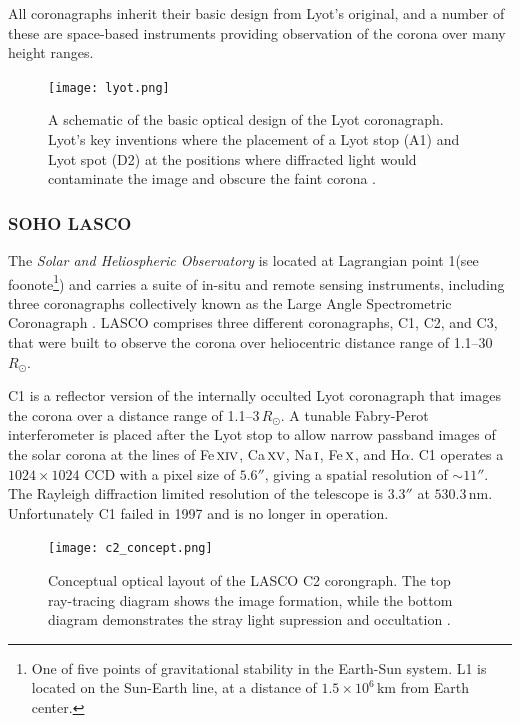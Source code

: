 All coronagraphs inherit their basic design from Lyot's original, and a number of these are space-based instruments providing observation of the corona over many height ranges.

\begin{figure}[!t]
\begin{center}
\texttt{[image: lyot.png]}
\caption[The Lyot coronagraph]{A schematic of the basic optical design of the Lyot coronagraph. Lyot's key inventions where the placement of a Lyot stop (A1) and Lyot spot (D2) at the positions where diffracted light would contaminate the image and obscure the faint corona \citep{bru95}.}
\label{fig:lyot}
\end{center}
\end{figure}

\subsubsection{SOHO LASCO}\label{sec:23}

The \emph{Solar and Heliospheric Observatory} \citep[\emph{SOHO};][]{dom95} is located at Lagrangian point 1(see foonote\footnote{{\color{blue}One of five points of gravitational stability in the Earth-Sun system. L1 is located on the Sun-Earth line, at a distance of $1.5\times10^6$\,km from Earth center.}}) and carries a suite of in-situ and remote sensing instruments, including three coronagraphs collectively known as the Large Angle Spectrometric Coronagraph \citep[LASCO;][]{bru95}. LASCO comprises three different coronagraphs, C1, C2, and C3, that were built to observe the corona over heliocentric distance range of 1.1--30\,$R_{\odot}$. 

C1 is a reflector version of the internally occulted Lyot coronagraph that images the corona over a distance range of 1.1--3\,$R_{\odot}$. A tunable Fabry-Perot interferometer is placed after the Lyot stop to allow narrow passband images of the solar corona at the lines of Fe\,$\textsc{xiv}$, Ca\,$\textsc{xv}$, Na\,$\textsc{i}$, Fe\,$\textsc{x}$, and H$\alpha$. 
C1 operates a $1024\times1024$ CCD with a pixel size of $5.6''$, giving a spatial resolution of $\sim11''$. The Rayleigh diffraction limited resolution of the telescope is $3.3''$ at $530.3$\,nm. Unfortunately C1 failed in 1997 and is no longer in operation. 
\begin{figure}[!t]
\begin{center}
\texttt{[image: c2\_concept.png]}
\caption[The LASCO C2 coronagraph optics]{Conceptual optical layout of the LASCO C2 corongraph. The top ray-tracing diagram shows the image formation, while the bottom diagram demonstrates the stray light supression and occultation \citep{bru95}.}
\label{fig:c2_concept}
\end{center}
\end{figure}

